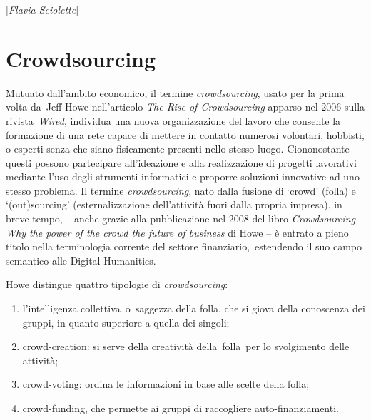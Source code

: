{[}\emph{Flavia Sciolette}{]}


\chapter{Crowdsourcing}

Mutuato dall'ambito economico, il termine \emph{crowdsourcing}, usato
per la prima volta da~Jeff Howe nell'articolo \emph{The Rise of
Crowdsourcing} apparso nel 2006 sulla rivista~\emph{Wired}, individua
una nuova organizzazione del lavoro che consente la formazione di una
rete capace di mettere in contatto numerosi volontari, hobbisti, o
esperti senza che siano fisicamente presenti nello stesso luogo.
Ciononostante questi possono partecipare all'ideazione e alla
realizzazione di progetti lavorativi mediante l'uso degli strumenti
informatici e proporre soluzioni innovative ad uno stesso problema. Il
termine \emph{crowdsourcing}, nato dalla fusione di `crowd' (folla) e
`(out)sourcing' (esternalizzazione dell'attività fuori dalla propria
impresa), in breve tempo, -- anche grazie alla pubblicazione nel 2008
del libro \emph{Crowdsourcing -- Why the power of the crowd the future
of business} di Howe -- è entrato a pieno titolo nella terminologia
corrente del settore finanziario,~estendendo il suo campo semantico alle
Digital Humanities.

Howe distingue quattro tipologie di \emph{crowdsourcing}:

\begin{enumerate}
\def\labelenumi{\arabic{enumi}.}
\item
  l'intelligenza collettiva~o~saggezza della folla, che si giova della
  conoscenza dei gruppi, in quanto superiore a quella dei singoli;
\item
  crowd-creation: si serve della creatività della~folla~per lo
  svolgimento delle attività;
\item
  crowd-voting: ordina le informazioni in base alle scelte della folla;
\item
  crowd-funding, che permette ai gruppi di raccogliere
  auto-finanziamenti.
\end{enumerate}

